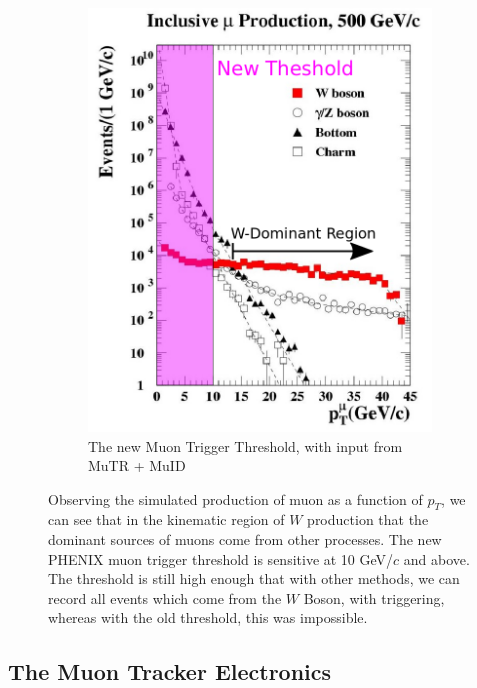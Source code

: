 \begin{figure}[ht]
\begin{subfigure}[b]{0.5\textwidth}
    \includegraphics[width=\textwidth]{./figures/w_dominant_region_new_trigger.png}
    \caption{The new Muon Trigger Threshold, with input from MuTR + MuID}
    \label{fig:trig_muon_new}
  \end{subfigure}
  \caption{ 
    Observing the simulated production of muon as a function of $p_T$, we can
    see that in the kinematic region of $W$ production that the dominant sources
    of muons come from other processes. The new PHENIX muon trigger threshold is
    sensitive at 10 GeV/$c$ and above. The threshold is still high enough that
    with other methods, we can record all events which come from the $W$ Boson,
    with triggering, whereas with the old threshold, this was impossible.
  }
  \label{fig:muon_production_vs_pt}
\end{figure}

\subsection{The Muon Tracker Electronics}

